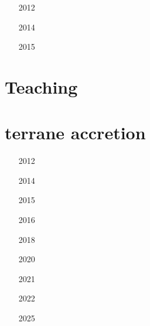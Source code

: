 \begin{small}
\begin{itemize}
\item[2012]
\item[2014]
\item[2015]
\end{itemize}
\end{small}

\section{Teaching} 

\begin{small}
\begin{itemize}
\item[\twothousandeleven]
\item[\twothousandfourteen]
\item[\twothousandnineteen] 
\item[\twothousandtwentyone] 
\end{itemize}
\end{small}

\section{terrane accretion} 

\begin{small}
\begin{itemize}
\item[2012] 
\item[2014] 
\item[2015] 
\item[2016] 
\item[2018] 
\item[2020] 
\item[2021] 
\item[2022] 
\item[2025] 
\end{itemize}
\end{small}

